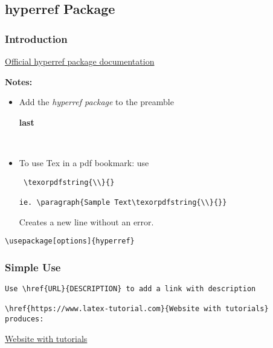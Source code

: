 %
%
%
%
% 
\subsection[hyperref Package]{\LARGE hyperref Package}

\subsubsection[Introduction]{\Large Introduction}

\href{../../documentation/packageDocs/hyperref2017.pdf}{Official hyperref package documentation}

\textbf{Notes:}
\begin{itemize}
\item Add the \textit{hyperref package} to the preamble\begin{large}\textbf{ last}\end{large}~\cite{hyperref}
\item To use Tex in a pdf bookmark: use \begin{verbatim} \texorpdfstring{\\}{}

ie. \paragraph{Sample Text\texorpdfstring{\\}{}}\end{verbatim}
Creates a new line without an error.
\end{itemize}

\begin{verbatim}\usepackage[options]{hyperref}\end{verbatim}

\subsubsection[Simple Use]{\Large Simple Use}
\begin{verbatim}Use \href{URL}{DESCRIPTION} to add a link with description

\href{https://www.latex-tutorial.com}{Website with tutorials}
produces:
\end{verbatim}
\href{https://www.latex-tutorial.com}{Website with tutorials}

